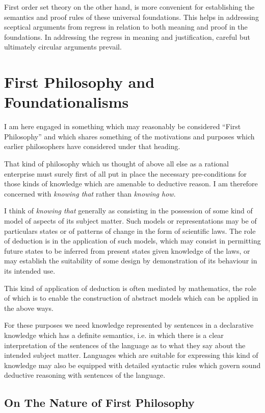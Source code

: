 \documentclass[10pt,titlepage]{book}
\begin{document}
First order set theory on the other hand, is more convenient for establishing the semantics and proof rules of these universal foundations.
This helps in addressing sceptical arguments from regress in relation to both meaning and proof in the foundations.
In addressing the regress in meaning and justification, careful but ultimately circular arguments prevail.

\chapter{First Philosophy and Foundationalisms}

I am here engaged in something which may reasonably be considered ``First Philosophy'' and which shares something of the motivations and purposes which earlier philosophers have considered under that heading.

That kind of philosophy which us thought of above all else as a rational enterprise must surely first of all put in place the necessary pre-conditions for those kinds of knowledge which are amenable to deductive reason.
I am therefore concerned with \emph{knowing that} rather than \emph{knowing how}.

I think of \emph{knowing that} generally as consisting in the possession of some kind of model of aspects of its subject matter.
Such models or representations may be of particulars states or of patterns of change  in the form of scientific laws. 
The role of deduction is in the application of such models, which may consist in permitting future states to be inferred from present states given knowledge of the laws, or may establish the suitability of some design by demonstration of its behaviour in its intended use.

This kind of application of deduction is often mediated by mathematics, the role of which is to enable the construction of abstract models which can be applied in the above ways.

For these purposes we need knowledge represented by sentences in a declarative knowledge which has a definite semantics, i.e. in which there is a clear interpretation of the sentences of the language as to what they say about the intended subject matter.
Languages which are suitable for expressing this kind of knowledge may also be equipped with detailed syntactic rules which govern sound deductive reasoning with sentences of the language.

\section{On The Nature of First Philosophy}
\end{document}
